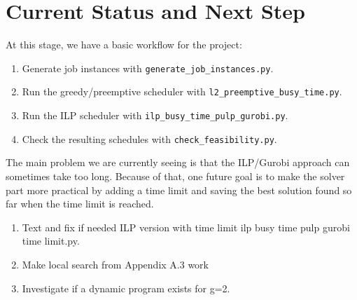 \documentclass[12pt]{article}
\begin{document}
\section*{Current Status and Next Step}

At this stage, we have a basic workflow for the project:

\begin{enumerate}[leftmargin=*]
    \item Generate job instances with \texttt{generate\_job\_instances.py}.
    \item Run the greedy/preemptive scheduler with
    \texttt{l2\_preemptive\_busy\_time.py}.
    \item Run the ILP scheduler with
    \texttt{ilp\_busy\_time\_pulp\_gurobi.py}.
    \item Check the resulting schedules with \texttt{check\_feasibility.py}.
    
\end{enumerate}

The main problem we are currently seeing is that the ILP/Gurobi approach can
sometimes take too long. Because of that, one future goal is to make the solver
part more practical by adding a time limit and saving the best solution found so
far when the time limit is reached.

\begin{enumerate}[leftmargin=*]
    \item Text and fix if needed ILP version with time limit ilp busy time pulp gurobi time limit.py.
    \item Make local search from Appendix A.3 work
    \item Investigate if a dynamic program exists for g=2.
\end{enumerate}
\end{document}
